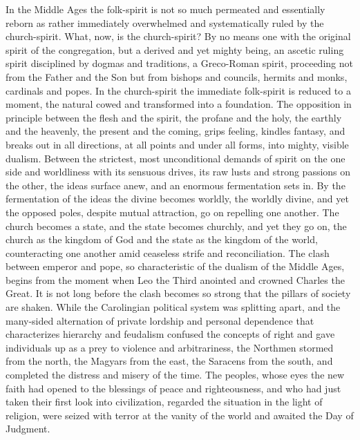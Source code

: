 \documentclass[12pt]{book}
\newcommand{\opage}[1]{\marginnote{\footnotesize\textit{[#1]}}}
\begin{document}
In the Middle Ages the folk-spirit is not so much permeated and
essentially reborn as rather immediately overwhelmed and systematically
ruled by the church-spirit. What, now, is the church-spirit? By no means
one with the original spirit of the congregation, but a derived and yet
mighty being, an ascetic ruling spirit disciplined by dogmas and
traditions, a Greco-Roman spirit, proceeding not from the Father and the
Son but from bishops and councils, hermits and monks, cardinals and
popes. In the church-spirit the immediate folk-spirit is reduced to a
moment, the natural cowed and transformed into a foundation. The
opposition in principle between the flesh and the spirit, the profane
and the holy, the earthly and the heavenly, the present and the coming,
grips feeling, kindles fantasy, and breaks out in all directions, at all
points and under all forms, into mighty, visible dualism. Between the
strictest, most unconditional demands of spirit on the one side and
worldliness with its sensuous drives, its raw lusts and strong
\opage{28}\setcounter{footnote}{0}%
passions on the other, the ideas surface anew, and an enormous
fermentation sets in. By the fermentation of the ideas the divine becomes
worldly, the worldly divine, and yet the opposed poles, despite mutual
attraction, go on repelling one another. The church becomes a state, and
the state becomes churchly, and yet they go on, the church as the kingdom
of God and the state as the kingdom of the world, counteracting one
another amid ceaseless strife and reconciliation. The clash between
emperor and pope, so characteristic of the dualism of the Middle Ages,
begins from the moment when Leo the Third anointed and crowned Charles
the Great. It is not long before the clash becomes so strong that the
pillars of society are shaken. While the Carolingian political system
was splitting apart, and the many-sided alternation of private lordship
and personal dependence that characterizes hierarchy and feudalism
confused the concepts of right and gave individuals up as a prey to
violence and arbitrariness, the Northmen stormed from the north, the
Magyars from the east, the Saracens from the south, and completed the
distress and misery of the time. The peoples, whose eyes the new faith
had opened to the blessings of peace and righteousness, and who had
just taken their first look into civilization, regarded the situation in
the light of religion, were seized with terror at the vanity of the
world and awaited the Day of Judgment.
\end{document}
